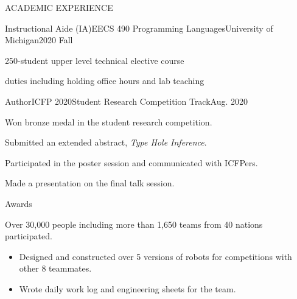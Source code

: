\documentclass{resume} %
\begin{document}
\begin{rSection}{ACADEMIC EXPERIENCE}

\begin{rrsection}{Instructional Aide (IA)}{EECS 490 Programming Languages}{University
  of Michigan}{2020 Fall}
  \item 250-student upper level technical elective course
  \item duties including holding office hours and lab teaching
\end{rrsection}

\begin{rrsection}{Author}{ICFP 2020}{Student Research Competition Track}{Aug. 2020}
  \item Won bronze medal in the student research competition.
  \item Submitted an extended abstract, \textit{Type Hole Inference}.
  \item Participated in the poster session and communicated with ICFPers.
  \item Made a presentation on the final talk session.
\end{rrsection}

\end{rSection}


\begin{rSection}{Awards}   

Over 30,000 people including more than 1,650 teams from 40 nations participated.
\begin{itemize}
  \item Designed and constructed over 5 versions of robots for competitions with other 8 teammates. 
	\item Wrote daily work log and engineering sheets for the team.
 \end{itemize} 
\end{rSection}


\end{document}
